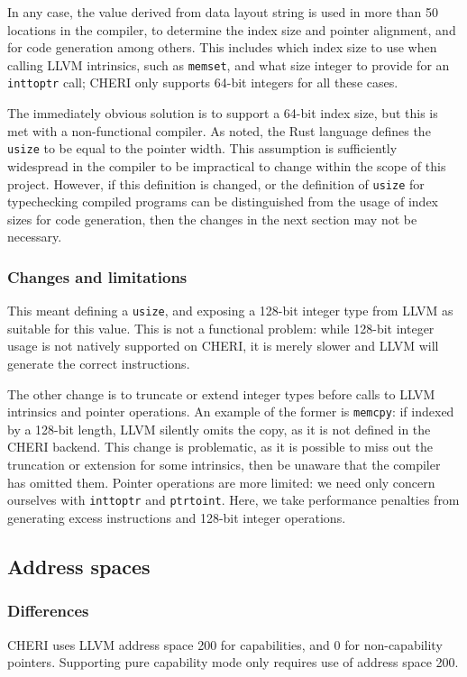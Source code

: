 \documentclass[dissertation.tex]{subfiles}
\begin{document}
In any case, the value derived from data layout string is used in more
than 50 locations in the compiler, to determine the index size and
pointer alignment, and for code generation among others.
This includes which index size to use when calling LLVM intrinsics, such
as \texttt{memset}, and what size integer to provide for an
\texttt{inttoptr} call; CHERI only supports 64-bit integers for all
these cases.

The immediately obvious solution is to support a 64-bit index size, but
this is met with a non-functional compiler.
As  noted, the Rust language defines the
\texttt{usize} to be equal to the pointer width.
This assumption is sufficiently widespread in the compiler to be
impractical to change within the scope of this project.
However, if this definition is changed, or the definition of
\texttt{usize} for typechecking compiled programs can be distinguished
from the usage of index sizes for code generation, then the changes in
the next section may not be necessary.


\subsubsection{Changes and limitations}
This meant defining a \texttt{usize}, and exposing a 128-bit integer
type from LLVM as suitable for this value.
This is not a functional problem: while 128-bit integer usage is not
natively supported on CHERI, it is merely slower and LLVM will generate
the correct instructions.

The other change is to truncate or extend integer types before calls to
LLVM intrinsics and pointer operations.
An example of the former is \texttt{memcpy}: if indexed by a 128-bit
length, LLVM silently omits the copy, as it is not defined in the
CHERI backend.
This change is problematic, as it is possible to miss out the truncation
or extension for some intrinsics, then be unaware that the compiler has
omitted them.
Pointer operations are more limited: we need only concern ourselves with
\texttt{inttoptr} and \texttt{ptrtoint}.
Here, we take performance penalties from generating excess instructions
and 128-bit integer operations.


\subsection{Address spaces}
\label{sec:impl-addrspace}

\subsubsection{Differences}
CHERI uses LLVM address space 200 for capabilities, and 0 for
non-capability pointers.
Supporting pure capability mode only requires use of address space 200.
\end{document}
